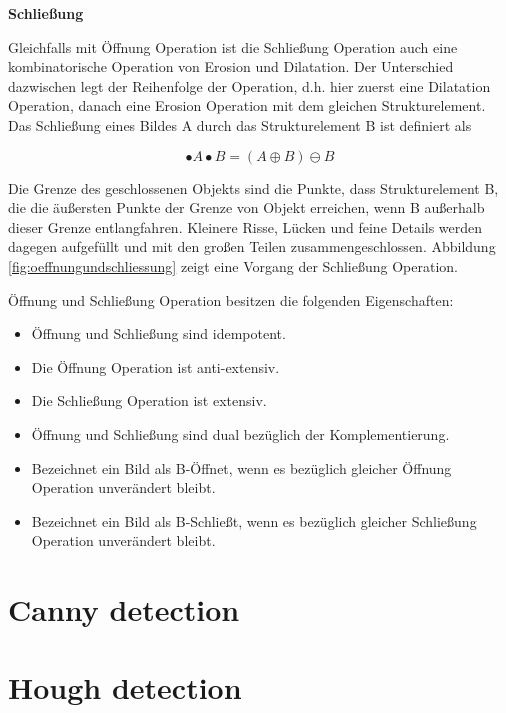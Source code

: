 \textbf{Schließung}

Gleichfalls mit Öffnung Operation ist die Schließung Operation auch eine kombinatorische Operation von Erosion und Dilatation. Der Unterschied dazwischen legt der Reihenfolge der Operation, d.h. hier zuerst eine Dilatation Operation, danach eine Erosion Operation mit dem gleichen Strukturelement. Das Schließung eines Bildes A durch das Strukturelement B ist definiert als

\begin{equation}
•A \bullet B =( A \oplus B )\ominus B  
\end{equation}

Die Grenze des geschlossenen Objekts sind die Punkte, dass Strukturelement B, die die äußersten Punkte der Grenze von Objekt erreichen, wenn B außerhalb dieser Grenze entlangfahren. Kleinere Risse, Lücken und feine Details werden dagegen aufgefüllt und mit den großen Teilen zusammengeschlossen. Abbildung \ref{fig:oeffnungundschliessung} zeigt eine Vorgang der Schließung Operation.


Öffnung und Schließung Operation besitzen die folgenden Eigenschaften:

\begin{itemize}

\item Öffnung und Schließung sind idempotent.
\item Die Öffnung Operation ist anti-extensiv. 
\item Die Schließung Operation ist extensiv.
\item Öffnung und Schließung sind dual bezüglich der Komplementierung.
\item Bezeichnet ein Bild als B-Öffnet, wenn es bezüglich gleicher Öffnung Operation unverändert bleibt. 
\item Bezeichnet ein Bild als B-Schließt, wenn es bezüglich gleicher Schließung Operation unverändert bleibt. 

\end{itemize}


\section{Canny detection}



\section{Hough detection}



